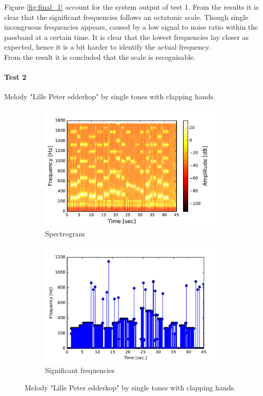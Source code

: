 Figure \ref{fig:final_1} account for the system output of test 1. From the results it is clear that the significant frequencies follows an octatonic scale. Though single incongruous frequencies appears, caused by a low signal to noise ratio within the passband at a certain time.
It is clear that the lowest frequencies lay closer as expected, hence it is a bit harder to identify the actual frequency. \\ 
From the result it is concluded that the scale is recognisable. 

\paragraph{Test 2} Melody "Lille Peter edderkop" by single tones with clapping hands.  
\begin{figure}[H]
\centering
\begin{subfigure}{0.49\textwidth}
\centering
\includegraphics[width=\textwidth]{figures/validation/systemtest/final_spec3.pdf}
\caption{Spectrogram}
\label{fig:final_spec2}
\end{subfigure}
\begin{subfigure}{0.49\textwidth}
\centering
\includegraphics[width=\textwidth]{figures/validation/systemtest/final_peak3.pdf}
\caption{Significant frequencies}
\label{fig:final_peak3}
\end{subfigure}
\caption{Melody "Lille Peter edderkop" by single tones with clapping hands.}
\label{fig:final_3}
\end{figure}  

